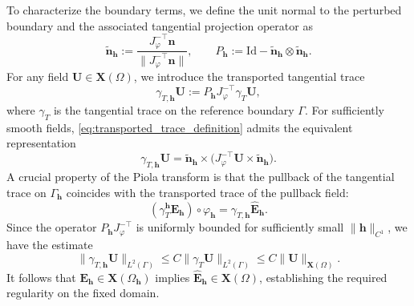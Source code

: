 \documentclass[12pt,reqno]{amsart}
\theoremstyle{definition}
\numberwithin{equation}{section}
\begin{document}
To characterize the boundary terms, we define the unit normal to the perturbed boundary and the associated tangential projection operator as
\[
\widetilde{\mathbf{n}}_{\mathbf{h}} := \frac{J_{\varphi}^{-\top} \mathbf{n}}{\|J_{\varphi}^{-\top} \mathbf{n}\|}, \qquad P_{\mathbf{h}} := \mathrm{Id} - \widetilde{\mathbf{n}}_{\mathbf{h}} \otimes \widetilde{\mathbf{n}}_{\mathbf{h}}.
\]
For any field $\mathbf{U} \in \mathbf{X}(\Omega)$, we introduce the transported tangential trace 
\begin{equation}\label{eq:transported_trace_definition}
\gamma_{T,\mathbf{h}} \mathbf{U} := P_{\mathbf{h}} J_{\varphi}^{-\top} \gamma_T \mathbf{U},
\end{equation}
where $\gamma_T$ is the tangential trace on the reference boundary $\Gamma$. For sufficiently smooth fields, \eqref{eq:transported_trace_definition} admits the equivalent representation
\begin{equation}\label{eq:E_tangential}
\gamma_{T,\mathbf{h}} \mathbf{U} = \widetilde{\mathbf{n}}_{\mathbf{h}} \times \bigl( J_{\varphi}^{-\top} \mathbf{U} \times \widetilde{\mathbf{n}}_{\mathbf{h}} \bigr).
\end{equation}
A crucial property of the Piola transform is that the pullback of the tangential trace on $\Gamma_{\mathbf{h}}$ coincides with the transported trace of the pullback field:
\begin{equation}\label{eq:transported_tangential_trace}
(\gamma_T^{\mathbf{h}} \mathbf{E}_{\mathbf{h}}) \circ \varphi_{\mathbf{h}} = \gamma_{T,\mathbf{h}} \hat{\mathbf{E}}_{\mathbf{h}}.
\end{equation}
Since the operator $P_{\mathbf{h}} J_{\varphi}^{-\top}$ is uniformly bounded for sufficiently small $\|\mathbf{h}\|_{C^1}$, we have the estimate
\[
\|\gamma_{T,\mathbf{h}} \mathbf{U}\|_{L^2(\Gamma)} \le C \|\gamma_T \mathbf{U}\|_{L^2(\Gamma)} \le C \|\mathbf{U}\|_{\mathbf{X}(\Omega)}.
\]
It follows that $\mathbf{E}_{\mathbf{h}} \in \mathbf{X}(\Omega_{\mathbf{h}})$ implies $\hat{\mathbf{E}}_{\mathbf{h}} \in \mathbf{X}(\Omega)$, establishing the required regularity on the fixed domain.
\end{document}
